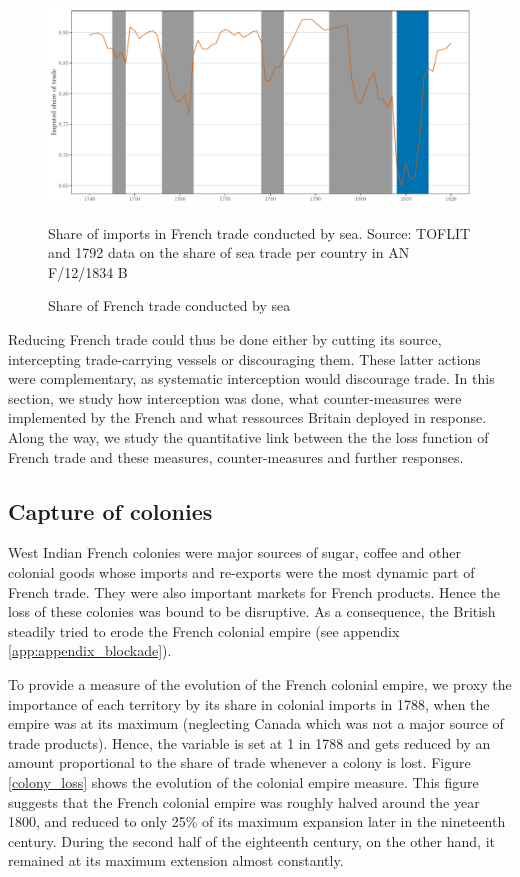 \documentclass[12pt,a4paper,notitlepage,english]{article}
\newcommand{\fontsmall}{\fontsize{10pt}{12pt}\selectfont}
\begin{document}
\begin{figure}[h!]
	\caption{Share of French trade conducted by sea}\label{share_by_sea}
	\centering
	\includegraphics[scale=.6]{share_by_sea}
	\begin{minipage}{18cm}
		\begin{flushleft}
			\fontsmall
			Share of imports in French trade conducted by sea. 
			Source: TOFLIT and 1792 data on the share of sea trade per country in AN F/12/1834 B
		\end{flushleft}
	\end{minipage}
\end{figure}

Reducing French trade could thus be done either by cutting its source, intercepting trade-carrying vessels or discouraging them.
These latter actions were complementary, as systematic interception would discourage trade. 
In this section, we study how interception was done, what counter-measures were implemented by the French and what ressources Britain deployed in response.
Along the way, we study the quantitative link between the the loss function of French trade and these measures, counter-measures and further responses.

\subsection{Capture of colonies}
West Indian French colonies were major sources of sugar, coffee and other colonial goods whose imports and re-exports were the most dynamic part of French trade.
They were also important markets for French products.
Hence the loss of these colonies was bound to be disruptive. 
As a consequence, the British steadily tried to erode the French colonial empire (see appendix \ref{app:appendix_blockade}).


To provide a measure of the evolution of the French colonial empire, we proxy the importance of each territory by its share in colonial imports in 1788, when the empire was at its maximum (neglecting Canada which was not a major source of trade products).
Hence, the variable is set at 1 in 1788 and gets reduced by an amount proportional to the share of trade whenever a colony is lost. 
Figure \ref{colony_loss} shows the evolution of the colonial empire measure.
This figure suggests that the French colonial empire was roughly halved around the year 1800, and reduced to only 25\% of its maximum expansion later in the nineteenth century.
During the second half of the eighteenth century, on the other hand, it remained at its maximum extension almost constantly.
\end{document}
